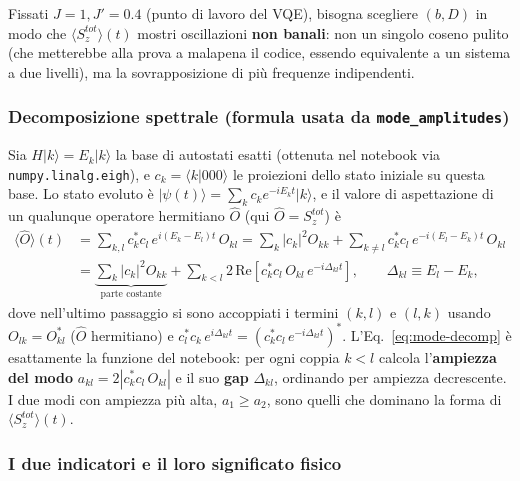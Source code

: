 \documentclass[11pt,a4paper]{article}
\newcommand{\ket}[1]{\lvert #1 \rangle}
\begin{document}
Fissati $J=1,J'=0.4$ (punto di lavoro del VQE), bisogna scegliere $(b,D)$
in modo che $\langle S_z^{tot}\rangle(t)$ mostri oscillazioni
\textbf{non banali}: non un singolo coseno pulito (che metterebbe alla
prova a malapena il codice, essendo equivalente a un sistema a due
livelli), ma la sovrapposizione di più frequenze indipendenti.

\subsubsection{Decomposizione spettrale (formula usata da \texttt{mode\_amplitudes})}

Sia $H\ket{k}=E_k\ket{k}$ la base di autostati esatti (ottenuta nel
notebook via \texttt{numpy.linalg.eigh}), e $c_k=\langle k\ket{000}$ le
proiezioni dello stato iniziale su questa base. Lo stato evoluto è
$\ket{\psi(t)}=\sum_k c_k e^{-iE_kt}\ket k$, e il valore di aspettazione
di un qualunque operatore hermitiano $\hat O$ (qui $\hat O=S_z^{tot}$) è
\begin{align}
\langle\hat O\rangle(t) &= \sum_{k,l} c_k^*c_l\,e^{i(E_k-E_l)t}\,O_{kl}
= \sum_k |c_k|^2 O_{kk} + \sum_{k\neq l} c_k^*c_l\,e^{-i(E_l-E_k)t}\,O_{kl}\\
&= \underbrace{\sum_k|c_k|^2O_{kk}}_{\text{parte costante}} + \sum_{k<l} 2\,\mathrm{Re}\!\left[c_k^*c_l\,O_{kl}\,e^{-i\Delta_{kl}t}\right], \qquad \Delta_{kl}\equiv E_l-E_k,
\label{eq:mode-decomp}
\end{align}
dove nell'ultimo passaggio si sono accoppiati i termini $(k,l)$ e
$(l,k)$ usando $O_{lk}=O_{kl}^*$ ($\hat O$ hermitiano) e
$c_l^*c_k\,e^{i\Delta_{kl}t}=(c_k^*c_l\,e^{-i\Delta_{kl}t})^*$. L'Eq.~\eqref{eq:mode-decomp}
è esattamente la funzione \texttt{} del notebook: per
ogni coppia $k<l$ calcola l'\textbf{ampiezza del modo}
$a_{kl}=2|c_k^*c_l\,O_{kl}|$ e il suo \textbf{gap} $\Delta_{kl}$, ordinando
per ampiezza decrescente. I due modi con ampiezza più alta, $a_1\ge a_2$,
sono quelli che dominano la forma di $\langle S_z^{tot}\rangle(t)$.

\subsubsection{I due indicatori e il loro significato fisico}
\end{document}
